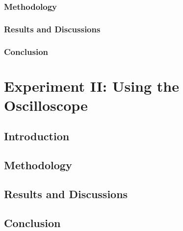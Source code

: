 \documentclass[11pt,times]{eeereport}
\begin{document}
\subsubsection{Methodology}


\subsubsection{Results and Discussions}

\subsubsection{Conclusion}


\section{Experiment II: Using the Oscilloscope}

\subsection{Introduction}

\subsection{Methodology}

\subsection{Results and Discussions}

\subsection{Conclusion}





\end{document}
